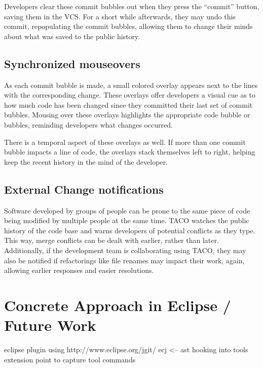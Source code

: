 \documentclass[conference]{IEEEtran}
\begin{document}
Developers clear these commit bubbles out when they press the ``commit'' button, saving them in the VCS.  
For a short while afterwards, they may undo this commit, repopulating the commit bubbles, allowing them to change their minds about what was saved to the public history.
\subsection{Synchronized mouseovers}
As each commit bubble is made, a small colored overlay appears next to the lines with the corresponding change.
These overlays offer developers a visual cue as to how much code has been changed since they 
committed their last set of commit bubbles.
Mousing over these overlays highlights the appropriate code bubble or bubbles,
reminding developers what changes occurred.

There is a temporal aspect of these overlays as well.
If more than one commit bubble impacts a line of code, the overlays stack
themselves left to right, helping keep the recent history in the mind of 
the developer.

\subsection{External Change notifications}
Software developed by groups of people can be prone to the same piece of code
being modified by multiple people at the same time.
TACO watches the public history of the code base and warns developers
of potential conflicts as they type.  
This way, merge conflicts can be dealt with earlier, rather than later.
Additionally, if the development team is collaborating using TACO, they
may also be notified if refactorings like file renames may impact their work, again, allowing earlier responses and easier resolutions.

\section{Concrete Approach in Eclipse / Future Work}

eclipse plugin using http://www.eclipse.org/jgit/
ecj <-- ast
hooking into tools extension point to capture tool commands


\end{document}
